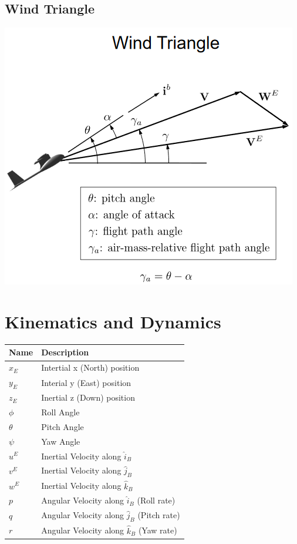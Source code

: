 \documentclass{article}
\begin{document}
\begin{multicols*}{3}
\subsection*{Wind Triangle}
\includegraphics[width=0.75\linewidth]{Images/wind_triangle.png}

\section*{Kinematics and Dynamics}
\begin{tabular}{|l|l|}
\hline
    Name        & Description\\ \hline
    $x_E$       & Intertial x (North) position \\
    $y_E$       & Interial y (East) position \\
    $z_E$       & Inertial z (Down) position \\
    $\phi$      & Roll Angle\\
    $\theta$    & Pitch Angle\\
    $\psi$      & Yaw Angle\\
    $u^E$       & Inertial Velocity along $\hat{i}_B$\\
    $v^E$       & Inertial Velocity along $\hat{j}_B$\\
    $w^E$       & Inertial Velocity along $\hat{k}_B$\\
    $p$         & Angular Velocity along $\hat{i}_B$ (Roll rate)\\
    $q$         & Angular Velocity along $\hat{j}_B$ (Pitch rate)\\
    $r$         & Angular Velocity along $\hat{k}_B$ (Yaw rate)\\ \hline
\end{tabular}

\end{multicols*}  
\end{document}
